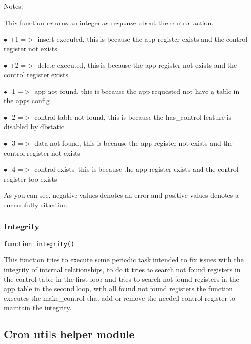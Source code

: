 \documentclass[a4paper]{article}
\begin{document}
Notes:

This function returns an integer as response about the control action:

\begin{compactitem}
\item[\color{myblue}$\bullet$] +1 =$>$ insert executed, this is because the app register exists and the control register not exists
\item[\color{myblue}$\bullet$] +2 =$>$ delete executed, this is because the app register not exists and the control register exists
\item[\color{myblue}$\bullet$] -1 =$>$ app not found, this is because the app requested not have a table in the apps config
\item[\color{myblue}$\bullet$] -2 =$>$ control table not found, this is because the has\_control feature is disabled by dbstatic
\item[\color{myblue}$\bullet$] -3 =$>$ data not found, this is because the app register not exists and the control register not exists
\item[\color{myblue}$\bullet$] -4 =$>$ control exists, this is because the app register exists and the control register too exists
\end{compactitem}

As you can see, negative values denotes an error and positive values denotes a successfully situation

\hypertarget{toc400}{}
\subsubsection{Integrity}

\begin{lstlisting}
function integrity()
\end{lstlisting}

This function tries to execute some periodic task intended to fix issues with
the integrity of internal relationships, to do it tries to search not found
registers in the control table in the first loop and tries to search not found
registers in the app table in the second loop, with all found not found registers
the function executes the make\_control that add or remove the needed control
register to maintain the integrity.

\hypertarget{toc401}{}
\subsection{Cron utils helper module}
\end{document}
